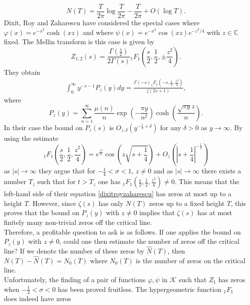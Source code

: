 \documentclass[11pt]{article}
\newcommand{\C}{\mathbb{C}}
\numberwithin{equation}{section}		 			%
\numberwithin{figure}{section}			 			%
\begin{document}
\[N(T) = \frac{T}{{2\pi }}\log \frac{T}{{2\pi }} - \frac{T}{{2\pi }} + O(\log T).\]
Dixit, Roy and Zaharescu have considered the special cases where $\varphi (x) = {e^{ - {x^2}}}\cosh (xz)$ and where $\psi (x) = {e^{ - {x^2}}}\cos (xz)e^{-z^2/4}$ with $z \in \C$ fixed. The Mellin transform is this case is given by
\[{Z_{1,2}}(s) = {\frac{{\Gamma (\tfrac{s}{2})}}{{2\Gamma (s)}}}{_1F_1}\left( {\frac{s}{2},\frac{1}{2}, \pm \frac{{{z^2}}}{4}} \right).\]
They obtain
\begin{align} \label{dixitroyzaharescu}
\int_0^\infty  {{y^{ - s - 1}}{P_z}(y)dy}  = \frac{{\Gamma {{( - s)}_1}{F_1}( - s,\tfrac{1}{2},\tfrac{{{z^2}}}{4})}}{{\zeta (2s + 1)}},
\end{align}
where
\[{P_z}(y) = \sum\limits_{n = 1}^\infty  {\frac{{\mu (n)}}{n}\exp \left( { - \frac{{\pi y}}{{{n^2}}}} \right)\cosh \left( {\frac{{\sqrt {\pi y} z}}{n}} \right)}. \]
In their case the bound on $P_z(s)$ is $O_{z,\delta}(y^{-\tfrac{1}{4}+\delta})$ for any $\delta>0$ as $y \to \infty$. By using the estimate
\[{_1F_1}\left( {\frac{s}{2},\frac{1}{2},\frac{{{z^2}}}{4}} \right) = {e^{\tfrac{{{z^2}}}{8}}}\cos \left( {z\sqrt {s + \frac{1}{4}} } \right) + {O_z}\left( {{{\left| {s + \frac{1}{4}} \right|}^{ - \tfrac{1}{2}}}} \right)\]
as $\left| s \right| \to \infty$ they argue that for $-\tfrac{1}{4} < \sigma < 1$, $z \ne 0$ and as $\left| s \right| \to \infty$ there exists a number $T_z$ such that for $t>T_z$ one has ${_1F_1}\left( {\frac{s}{2},\frac{1}{2},\frac{{{z^2}}}{4}} \right) \ne 0$. This means that the left-hand side of their equation \eqref{dixitroyzaharescu} has zeros at most up to a height $T$. However, since $\zeta(s)$ has only $N(T)$ zeros up to a fixed height $T$, this proves that the bound on $P_z(y)$ with $z \ne 0$ implies that $\zeta(s)$ has at most finitely many non-trivial zeros off the critical line.\\
Therefore, a profitable question to ask is as follows. If one applies the bound on $P_z(y)$ with $z \ne 0$, could one then estimate the number of zeros off the critical line? If we denote the number of these zeros by $\hat N(T)$, then $N(T) - \hat N(T) = N_0(T)$ where $N_0(T)$ is the number of zeros on the critical line.\\
Unfortunately, the finding of a pair of functions $\varphi, \psi$ in $\mathcal{K}$ such that $Z_1$ has zeros when $-\tfrac{1}{2} < \sigma <0$ has been proved fruitless. The hypergeometric function $_1F_1$ does indeed have zeros
\end{document}
